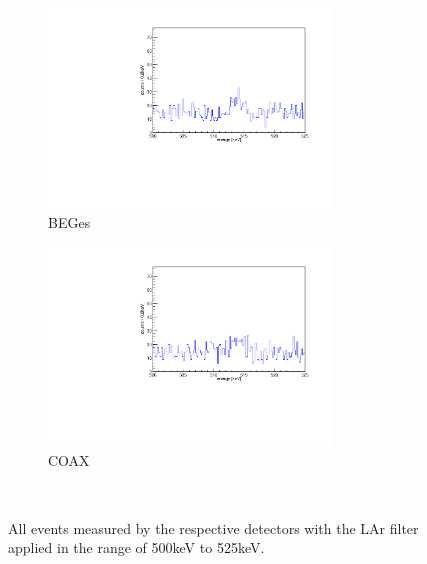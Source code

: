 \documentclass[encoding=utf8,british]{tumphthesis}
\begin{document}
\begin{figure}[t!]
\centering
\begin{subfigure}{0.5\textwidth}
	\includegraphics[width=75mm]{./Bilder/500525LArVetoBEGes.pdf}
    \caption{BEGes}
  \label{fig:LArBEGes}
\end{subfigure}%
\begin{subfigure}{0.5\textwidth}
	\includegraphics[width=75mm]{./Bilder/500525LArVetoCOAX.pdf}
  \caption{COAX}
  \label{fig:LArCOAX}
\end{subfigure}
    \\
	\vspace{0.5cm}
    \caption{All events measured by the respective detectors with the LAr filter applied in the range of 500keV to 525keV.}
\end{figure}
\end{document}
